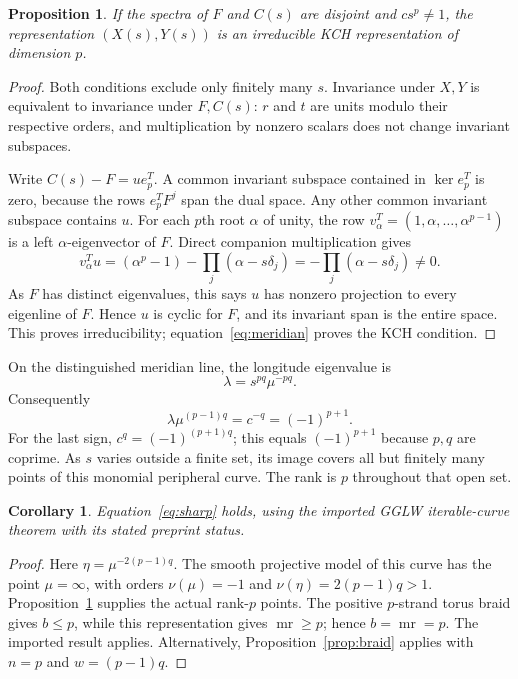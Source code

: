 \documentclass[11pt]{article}
\newtheorem{proposition}[theorem]{Proposition}
\newtheorem{corollary}[theorem]{Corollary}
\newcommand{\mr}{\operatorname{mr}}
\begin{document}
\begin{proposition}\label{prop:irred}
If the spectra of $F$ and $C(s)$ are disjoint and $cs^p\ne1$,
the representation $(X(s),Y(s))$ is an irreducible KCH representation
of dimension $p$.
\end{proposition}
\begin{proof}
Both conditions exclude only finitely many $s$. Invariance under
$X,Y$ is equivalent to invariance under $F,C(s)$: $r$ and $t$ are
units modulo their respective orders, and multiplication by nonzero
scalars does not change invariant subspaces.

Write $C(s)-F=u e_p^T$. A common invariant subspace contained in
$\ker e_p^T$ is zero, because the rows $e_p^TF^j$ span the dual
space. Any other common invariant subspace contains $u$. For each
$p$th root $\alpha$ of unity, the row
$v_\alpha^T=(1,\alpha,\ldots,\alpha^{p-1})$ is a left
$\alpha$-eigenvector of $F$. Direct companion multiplication gives
\[
 v_\alpha^Tu=(\alpha^p-1)-\prod_j(\alpha-s\delta_j)
 =-\prod_j(\alpha-s\delta_j)\ne0.
\]
As $F$ has distinct eigenvalues, this says $u$ has nonzero projection
to every eigenline of $F$. Hence $u$ is cyclic for $F$, and its
invariant span is the entire space. This proves irreducibility;
equation~\eqref{eq:meridian} proves the KCH condition.
\end{proof}

On the distinguished meridian line, the longitude eigenvalue is
\[
 \lambda=s^{pq}\mu^{-pq}.
\]
Consequently
\[
 \lambda\mu^{(p-1)q}=c^{-q}=(-1)^{p+1}.
\]
For the last sign, $c^q=(-1)^{(p+1)q}$; this equals
$(-1)^{p+1}$ because $p,q$ are coprime. As $s$ varies outside a
finite set, its image covers all but finitely many points of this
monomial peripheral curve. The rank is $p$ throughout that open set.

\begin{corollary}
Equation~\eqref{eq:sharp} holds, using the imported GGLW
iterable-curve theorem with its stated preprint status.
\end{corollary}
\begin{proof}
Here $\eta=\mu^{-2(p-1)q}$. The smooth projective model of this
curve has the point $\mu=\infty$, with orders
$\nu(\mu)=-1$ and $\nu(\eta)=2(p-1)q>1$. Proposition~\ref{prop:irred}
supplies the actual rank-$p$ points. The positive $p$-strand torus
braid gives $b\le p$, while this representation gives $\mr\ge p$;
hence $b=\mr=p$. The imported result applies. Alternatively,
Proposition~\ref{prop:braid} applies with $n=p$ and $w=(p-1)q$.
\end{proof}
\end{document}
